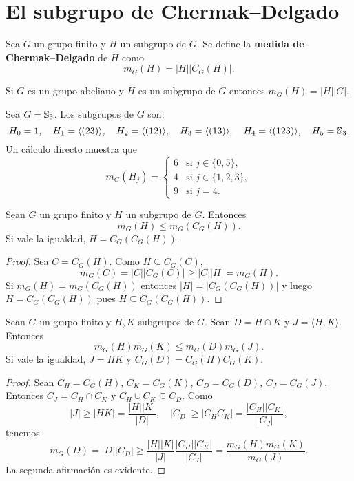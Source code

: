 \chapter{El subgrupo de Chermak--Delgado}
\label{CD}

\begin{definition}
	Sea $G$ un grupo finito y $H$ un subgrupo de $G$. Se define la
	\textbf{medida de Chermak--Delgado} de $H$ como 
	\[
		m_G(H)=|H||C_G(H)|.
	\]
\end{definition}

\begin{example}
	Si $G$ es un grupo abeliano y $H$ es un subgrupo de $G$ entonces
	$m_G(H)=|H||G|$.
\end{example}

\begin{example}
	Sea $G=\mathbb{S}_3$. Los subgrupos de $G$ son:
	\[
		H_0=1,\quad
		H_1=\langle (23)\rangle,\quad
		H_2=\langle (12)\rangle,\quad
		H_3=\langle (13)\rangle,\quad
		H_4=\langle (123)\rangle,\quad
		H_5=\mathbb{S}_3.
	\]
	Un cálculo directo muestra que
	\[
		m_G(H_j)=\begin{cases}
			6 & \text{si $j\in\{0,5\}$},\\
			4 & \text{si $j\in\{1,2,3\}$},\\
			9 & \text{si $j=4$}.
		\end{cases}
	\]
\end{example}

\begin{lemma}
	\label{lemma:CD1}
	Sean $G$ un grupo finito y $H$ un subgrupo de $G$. Entonces 
	\[
	m_G(H)\leq m_G(C_G(H)).
	\]
	Si vale la igualdad, $H=C_G(C_G(H))$.
\end{lemma}

\begin{proof}
	Sea $C=C_G(H)$. 
	Como $H\subseteq C_G(C)$, 
	\[
	m_G(C)=|C||C_G(C)|\geq |C||H|=m_G(H). 
	\]
	Si $m_G(H)=m_G(C_G(H))$ entonces $|H|=|C_G(C_G(H))|$ y
	luego $H=C_G(C_G(H))$ pues $H\subseteq C_G(C_G(H))$. 
\end{proof}

\begin{lemma}
	Sean $G$ un grupo finito y 
	$H,K$ subgrupos de $G$. Sean $D=H\cap K$ y $J=\langle H,K\rangle$. Entonces
	\[
		m_G(H)m_G(K)\leq m_G(D)m_G(J).
	\]
	Si vale la igualdad, $J=HK$ y $C_G(D)=C_G(H)C_G(K)$.
	\label{lemma:CD2}
\end{lemma}

\begin{proof}
	Sean $C_H=C_G(H)$, $C_K=C_G(K)$, $C_D=C_G(D)$, $C_J=C_G(J)$. Entonces
	$C_J=C_H\cap C_K$ y $C_H\cup C_K\subseteq C_D$. Como
	\[
		|J|\geq |HK|=\frac{|H||K|}{|D|},
		\quad
		|C_D|\geq |C_HC_K|=\frac{|C_H||C_K|}{|C_J|},
	\]
	tenemos
	\[
		m_G(D)
		=|D||C_D|\geq \frac{|H||K|}{|J|}\frac{|C_H||C_K|}{|C_J|}
		=\frac{m_G(H)m_G(K)}{m_G(J)}.
	\]
	La segunda afirmación es evidente. 
\end{proof}

